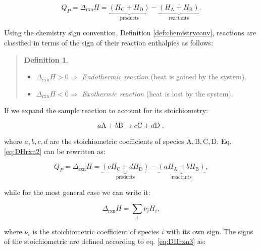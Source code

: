 \documentclass[
]{book}
\providecommand{\tightlist}{%
  \setlength{\itemsep}{0pt}\setlength{\parskip}{0pt}}
\theoremstyle{definition}
\newtheorem{definition}{Definition}[chapter]
\theoremstyle{definition}
\theoremstyle{definition}
\theoremstyle{remark}
\begin{document}
\begin{equation}
  Q_P = \Delta_{\text{rxn}} H = \underbrace{ \left (H_{\mathrm{C}}+H_{\mathrm{D}} \right) }_{\text{products}} - \underbrace{\left( H_{\mathrm{A}}+H_{\mathrm{B}}\right)}_{\text{reactants}}.
  \label{eq:DHrxn2}
\end{equation}

Using the chemistry sign convention, Definition \ref{def:chemistryconv}, reactions are classified in terms of the sign of their reaction enthalpies as follows:

\begin{quote}
\begin{definition}
\protect\hypertarget{def:exoendo}{}{\label{def:exoendo} }\(\;\)

\begin{itemize}
\tightlist
\item
  \(\Delta_{\text{rxn}} H > 0 \Rightarrow\) \emph{Endothermic reaction} (heat is gained by the system).
\item
  \(\Delta_{\text{rxn}} H < 0 \Rightarrow\) \emph{Exothermic reaction} (heat is lost by the system).
\end{itemize}
\end{definition}
\end{quote}

If we expand the sample reaction to account for its stoichiometry:

\[ a\mathrm{A} + b\mathrm{B} \rightarrow c\mathrm{C} + d\mathrm{D}\; , \]

where \(a,b,c,d\) are the stoichiometric coefficients of species \(\mathrm{A,B,C,D}\). Eq. \eqref{eq:DHrxn2} can be rewritten as:

\begin{equation}
  Q_P = \Delta_{\text{rxn}} H = \underbrace{\left( cH_{\mathrm{C}}+dH_{\mathrm{D}} \right) }_{\text{products}} - \underbrace{ \left( aH_{\mathrm{A}}+bH_{\mathrm{B}} \right)}_{\text{reactants}},
  \label{eq:DHrxn3}
\end{equation}

while for the most general case we can write it:

\begin{equation}
  \Delta_{\text{rxn}} H = \sum_i \nu_i H_i,
  \label{eq:DHrxn4}
\end{equation}

where \(\nu_i\) is the stoichiometric coefficient of species \(i\) with its own sign. The signs of the stoichiometric are defined according to eq. \eqref{eq:DHrxn3} as:
\end{document}
